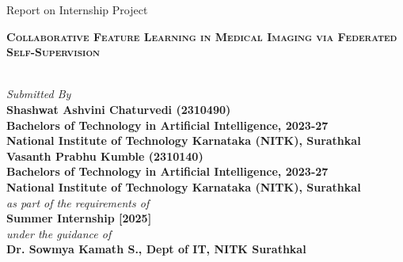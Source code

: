 \documentclass[a4paper, 10 pt, conference]{ieeeconf}
\title{\color{red}{Update project report title}}
\begin{document}
\onecolumn
\begin{center}
{\Large Report on Internship Project}\\
    
    \vspace{2.0em}
    
    {\LARGE\textbf{\textsc {{\color{red} Collaborative Feature Learning in Medical Imaging via Federated Self-Supervision}}}}

   	\vspace{1.0em}
			\Large\textit{\\Submitted By}\\
			\vspace{1em}
{{\color{red}
                \LARGE\textbf{Shashwat Ashvini Chaturvedi (2310490)} \\
       \Large\textbf{Bachelors of Technology in Artificial Intelligence, 2023-27} \\
      \Large\textbf{National Institute of Technology Karnataka (NITK), Surathkal} \\
      \vspace{1em}
			\LARGE\textbf{Vasanth Prabhu Kumble (2310140)} \\
       \Large\textbf{Bachelors of Technology in Artificial Intelligence, 2023-27} \\
      \Large\textbf{National Institute of Technology Karnataka (NITK), Surathkal} \\
}
}
		\vspace{1.5em}
		\large{\textit{as part of the requirements of }}\\
		\vspace{1em}
		\LARGE{\textbf{Summer Internship [2025]}} \\
		
        \vspace{1.5em}
		\large{\textit{under the guidance of}} \\
		\vspace{1em}
		\LARGE{\textbf{Dr. Sowmya Kamath S., Dept of IT, NITK Surathkal}} \\ 
		
		\vspace{2em}
		

\end{center}
\end{document}
